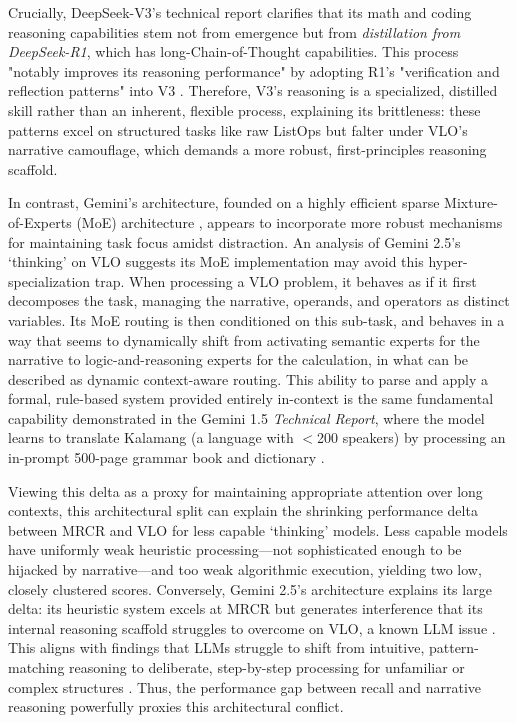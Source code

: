 \documentclass{article}
\begin{document}
Crucially, DeepSeek-V3's technical report clarifies that its math and coding reasoning capabilities stem not from emergence but from \emph{distillation from DeepSeek-R1}, which has long-Chain-of-Thought capabilities. This process "notably improves its reasoning performance" by adopting R1's "verification and reflection patterns" into V3 \citep{deepseekv3}. Therefore, V3's reasoning is a specialized, distilled skill rather than an inherent, flexible process, explaining its brittleness: these patterns excel on structured tasks like raw ListOps but falter under VLO's narrative camouflage, which demands a more robust, first-principles reasoning scaffold.

In contrast, Gemini's architecture, founded on a highly efficient sparse Mixture-of-Experts (MoE) architecture \citep{gemini_15}, appears to incorporate more robust mechanisms for maintaining task focus amidst distraction. An analysis of Gemini 2.5's `thinking' on VLO suggests its MoE implementation may avoid this hyper-specialization trap. When processing a VLO problem, it behaves as if it first decomposes the task, managing the narrative, operands, and operators as distinct variables. Its MoE routing is then conditioned on this sub-task, and behaves in a way that seems to dynamically shift from activating semantic experts for the narrative to logic-and-reasoning experts for the calculation, in what can be described as dynamic context-aware routing. This ability to parse and apply a formal, rule-based system provided entirely in-context is the same fundamental capability demonstrated in the Gemini 1.5 \emph{Technical Report}, where the model learns to translate Kalamang (a language with $<$200 speakers) by processing an in-prompt 500-page grammar book and dictionary \citep{gemini_15}.

Viewing this delta as a proxy for maintaining appropriate attention over long contexts, this architectural split can explain the shrinking performance delta between MRCR and VLO for less capable `thinking' models. Less capable models have uniformly weak heuristic processing—not sophisticated enough to be hijacked by narrative—and too weak algorithmic execution, yielding two low, closely clustered scores. Conversely, Gemini 2.5's architecture explains its large delta: its heuristic system excels at MRCR but generates interference that its internal reasoning scaffold struggles to overcome on VLO, a known LLM issue \citep{shi2023large, med_distract_qa}. This aligns with findings that LLMs struggle to shift from intuitive, pattern-matching reasoning to deliberate, step-by-step processing for unfamiliar or complex structures \citep{gsm-symbolic}. Thus, the performance gap between recall and narrative reasoning powerfully proxies this architectural conflict.
\end{document}
